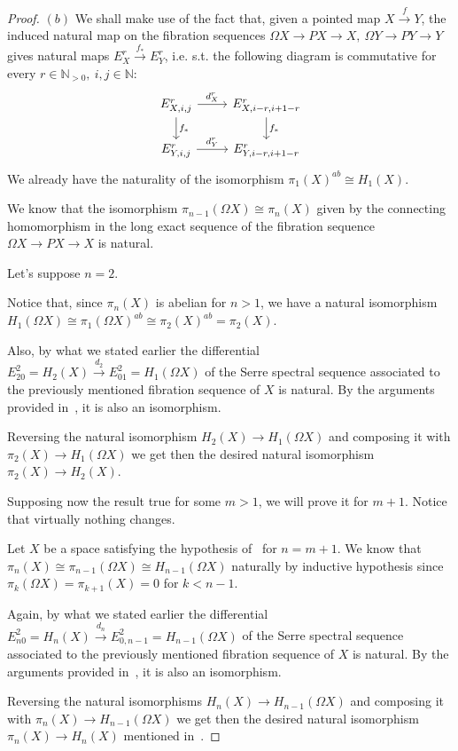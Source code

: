 \documentclass{article}
\newcommand{\numberset}{\mathbb}
\newcommand{\N}{\numberset{N}}
\begin{document}
\begin{proof}
    $(b)$ We shall make use of the fact that, given a pointed map
    $X\xrightarrow{f}Y$, the induced natural map on the fibration sequences
    $\Omega X\rightarrow PX\rightarrow X,\ \Omega Y\rightarrow PY\rightarrow Y$
    gives natural maps $E^r_X\xrightarrow{f_*} E^r_Y$, i.e. s.t. the
    following diagram is commutative for every $r\in\N_{>0},\ i,j\in\N$:
    \[
        \begin{tikzcd}
            E^r_{X,i,j}\arrow{r}{d^r_X}\arrow{d}{f_*}
            & E^r_{X,i-r,i+1-r}\arrow{d}{f_*} \\
            E^r_{Y,i,j}\arrow{r}{d^r_Y}
            & E^r_{Y,i-r,i+1-r}
        \end{tikzcd}
    \]
    We already have the naturality of the isomorphism
    $\pi_1(X)^{ab}\cong H_1(X)$.

    We know that the isomorphism $\pi_{n-1}(\Omega X)\cong\pi_n(X)$ given by the
    connecting homomorphism in the long exact sequence of the fibration sequence
    $\Omega X\rightarrow PX\rightarrow X$ is natural.

    Let's suppose $n=2$.
    
    Notice that, since $\pi_n(X)$ is abelian for $n>1$, we have a natural
    isomorphism $H_1(\Omega X)\cong\pi_1(\Omega X)^{ab}\cong\pi_2(X)^{ab}=
    \pi_2(X)$.
    
    Also, by what we stated earlier the differential
    $E^2_{20}=H_2(X)\xrightarrow{d_2}E^2_{01}=H_1(\Omega X)$ of the Serre
    spectral sequence associated to the previously mentioned fibration sequence
    of $X$ is natural. By the arguments provided in~\cite[thm. 11.6]{HM19}, it
    is also an isomorphism.

    Reversing the natural isomorphism $H_2(X)\rightarrow
    H_1(\Omega X)$ and composing it with $\pi_2(X)\rightarrow
    H_1(\Omega X)$ we get then the desired natural isomorphism
    $\pi_2(X)\rightarrow H_2(X)$.

    Supposing now the result true for some $m>1$, we will prove it for $m+1$.
    Notice that virtually nothing changes.

    Let $X$ be a space satisfying the hypothesis of~\cite[thm. 11.6]{HM19} for
    $n=m+1$. We know that $\pi_n(X)\cong\pi_{n-1}(\Omega X)\cong
    H_{n-1}(\Omega X)$ naturally by inductive hypothesis since $\pi_k(\Omega X)=
    \pi_{k+1}(X)=0$ for $k<n-1$.

    Again, by what we stated earlier the differential
    $E^2_{n0}=H_n(X)\xrightarrow{d_n}E^2_{0,n-1}=H_{n-1}(\Omega X)$ of the Serre
    spectral sequence associated to the previously mentioned fibration sequence
    of $X$ is natural. By the arguments provided in~\cite[thm. 11.6]{HM19}, it
    is also an isomorphism.

    Reversing the natural isomorphisms $H_n(X)\rightarrow H_{n-1}(\Omega X)$ and
    composing it with $\pi_n(X)\rightarrow H_{n-1}(\Omega X)$ we get then the
    desired natural isomorphism $\pi_n(X)\rightarrow H_n(X)$ mentioned
    in~\cite[thm. 11.6]{HM19}.
\end{proof}
\end{document}
